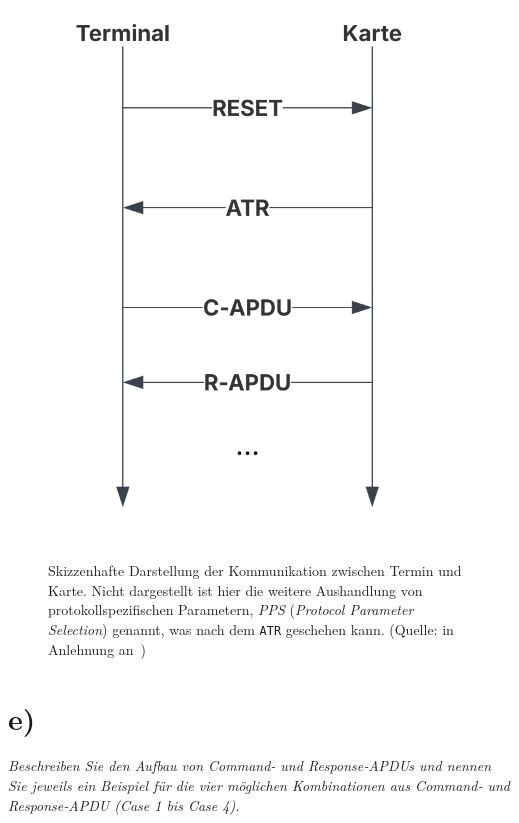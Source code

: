 \begin{figure}
    \centering
    \includegraphics[scale=0.4]{aufgabe 1/img/apdu.svg}
    \caption{Skizzenhafte Darstellung der Kommunikation zwischen Termin und Karte. Nicht dargestellt ist hier die weitere Aushandlung von protokollspezifischen Parametern, \textit{PPS} (\textit{Protocol Parameter Selection}) genannt, was nach dem \texttt{ATR} geschehen kann. (Quelle: in Anlehnung an~\cite[\textbf{Bild 6.1}, 378]{RF02})}
    \label{fig:apdu}
\end{figure}


\section{e)}

\textit{Beschreiben Sie den Aufbau von Command‐ und Response‐APDUs und nennen
Sie jeweils ein Beispiel für die vier möglichen Kombinationen aus Command‐
und Response‐APDU (Case 1 bis Case 4).}\\


